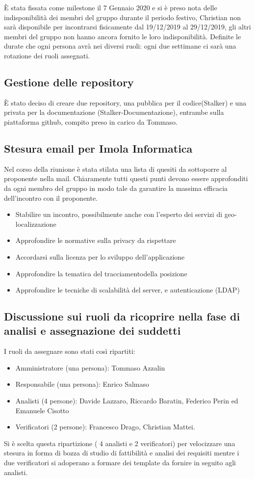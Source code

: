 È stata fissata come milestone il 7 Gennaio 2020 e si è preso nota delle indisponibilità dei membri del gruppo durante il periodo festivo, Christian non sarà disponibile per incontrarsi fisicamente dal 19/12/2019 al 29/12/2019, gli altri membri del gruppo non hanno ancora fornito le loro indisponibilità. 
Definite le durate che ogni persona avrà nei diversi ruoli: ogni due settimane ci sarà una rotazione dei ruoli assegnati. \\

\subsection{Gestione delle repository}
È stato deciso di creare due repository, una pubblica per il codice(Stalker) e una privata per la documentazione (Stalker-Documentazione), entrambe sulla piattaforma github, compito preso in carico da Tommaso. \\

\subsection{Stesura email per Imola Informatica}
Nel corso della riunione è stata stilata una lista di quesiti da sottoporre al proponente nella mail. 
Chiaramente tutti questi punti devono essere approfonditi da ogni membro del gruppo in modo tale da garantire la massima efficacia dell'incontro con il proponente.
\begin{itemize}
\item Stabilire un incontro, possibilmente anche con l’esperto dei servizi di geo-localizzazione
\item Approfondire le normative sulla privacy da rispettare
\item Accordarsi sulla licenza per lo sviluppo dell'applicazione
\item Approfondire la tematica del tracciamentodella posizione
\item Approfondire le tecniche di scalabilità del server, e autenticazione (LDAP)
\end{itemize} 

\subsection{ Discussione sui ruoli da ricoprire nella fase di analisi e assegnazione dei suddetti}
I ruoli da assegnare sono stati così ripartiti: 
\begin{itemize}
\item Amministratore (una persona): Tommaso Azzalin
\item Responsabile (una persona): Enrico Salmaso
\item Analisti (4 persone): Davide Lazzaro, Riccardo Baratin, Federico Perin ed Emanuele Cisotto
\item Verificatori (2 persone): Francesco Drago, Christian Mattei.
\end{itemize}
Si è scelta questa ripartizione ( 4 analisti e 2 verificatori) per velocizzare una stesura in forma di 
bozza di studio di fattibilità e analisi dei requisiti mentre i due verificatori si adoperano a formare dei template
da fornire in seguito agli analisti.
\\
